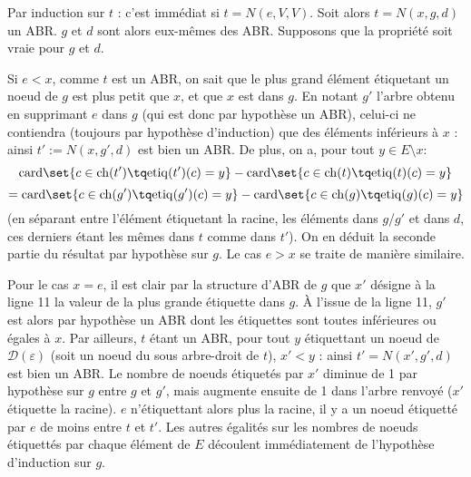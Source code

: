 \documentclass{scrartcl}
\begin{document}
			\begin{demo}
				\item Par induction sur $t$ : c'est immédiat si $t = N(e,V,V)$. 
					Soit alors $t = N(x,g,d)$ un ABR. $g$ et $d$ sont alors eux-mêmes des ABR.
					Supposons que la propriété soit vraie pour $g$ et $d$.
				\item Si $e < x$, comme $t$ est un ABR, on sait que le plus grand élément étiquetant un noeud de $g$ est plus petit que $x$, et que $x$ est dans $g$.
					En notant $g'$ l'arbre obtenu en supprimant $e$ dans $g$ (qui est donc par hypothèse un ABR), 
					celui-ci ne contiendra (toujours par hypothèse d'induction) que des éléments inférieurs à $x$ : ainsi $t' := N(x,g',d)$ est bien un ABR.
					De plus, on a, pour tout $y \in E \setminus{x}$: 
					\[
						\mathrm{card}\set{c \in \mathrm{ch}(t') \tq \mathrm{etiq}(t')(c) = y} - \mathrm{card}\set{c \in \mathrm{ch}(t) \tq \mathrm{etiq}(t)(c) = y}
					\]\[
						= \mathrm{card}\set{c \in \mathrm{ch}(g') \tq \mathrm{etiq}(g')(c) = y} - \mathrm{card}\set{c \in \mathrm{ch}(g) \tq \mathrm{etiq}(g)(c) = y}
					\]
					(en séparant entre l'élément étiquetant la racine, les éléments dans $g$/$g'$ et dans $d$, ces derniers étant les mêmes dans $t$ comme dans $t'$).
					On en déduit la seconde partie du résultat par hypothèse sur $g$. Le cas $e > x$ se traite de manière similaire.
				\item Pour le cas $x = e$, il est clair par la structure d'ABR de $g$ que $x'$ désigne à la ligne 11 la valeur de la plus grande étiquette dans $g$.
					À l'issue de la ligne 11, $g'$ est alors par hypothèse un ABR dont les étiquettes sont toutes inférieures ou égales à $x$. 
					Par ailleurs, $t$ étant un ABR, pour tout $y$ étiquettant un noeud de $\mathscr{D}(\varepsilon)$ (soit un noeud du sous arbre-droit de $t$), $x' < y$ :
					ainsi $t' = N(x',g',d)$ est bien un ABR. Le nombre de noeuds étiquetés par $x'$ diminue de 1 par hypothèse sur $g$ entre $g$ et $g'$,
					mais augmente ensuite de 1 dans l'arbre renvoyé ($x'$ étiquette la racine). 
					$e$ n'étiquettant alors plus la racine, il y a un noeud étiquetté par $e$ de moins entre $t$ et $t'$.
					Les autres égalités sur les nombres de noeuds étiquettés par chaque élément de $E$ découlent immédiatement de l'hypothèse d'induction sur $g$.
			\end{demo}
\end{document}
